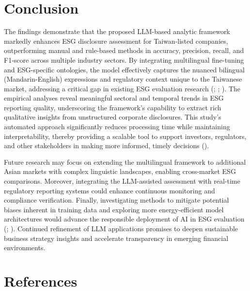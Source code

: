 \documentclass[
  12pt,
]{article}
\begin{document}
\section{Conclusion}\label{conclusion}

The findings demonstrate that the proposed LLM-based analytic framework
markedly enhances ESG disclosure assessment for Taiwan-listed companies,
outperforming manual and rule-based methods in accuracy, precision,
recall, and F1-score across multiple industry sectors. By integrating
multilingual fine-tuning and ESG-specific ontologies, the model
effectively captures the nuanced bilingual (Mandarin-English)
expressions and regulatory context unique to the Taiwanese market,
addressing a critical gap in existing ESG evaluation research
(;
; ). The empirical analyses reveal meaningful
sectoral and temporal trends in ESG reporting quality, underscoring the
framework's capability to extract rich qualitative insights from
unstructured corporate disclosures. This study's automated approach
significantly reduces processing time while maintaining
interpretability, thereby providing a scalable tool to support
investors, regulators, and other stakeholders in making more informed,
timely decisions ().

Future research may focus on extending the multilingual framework to
additional Asian markets with complex linguistic landscapes, enabling
cross-market ESG comparisons. Moreover, integrating the LLM-assisted
assessment with real-time regulatory reporting systems could enhance
continuous monitoring and compliance verification. Finally,
investigating methods to mitigate potential biases inherent in training
data and exploring more energy-efficient model architectures would
advance the responsible deployment of AI in ESG evaluation
(;
). Continued refinement of LLM
applications promises to deepen sustainable business strategy insights
and accelerate transparency in emerging financial environments.

\section*{References}\label{references}
\end{document}
